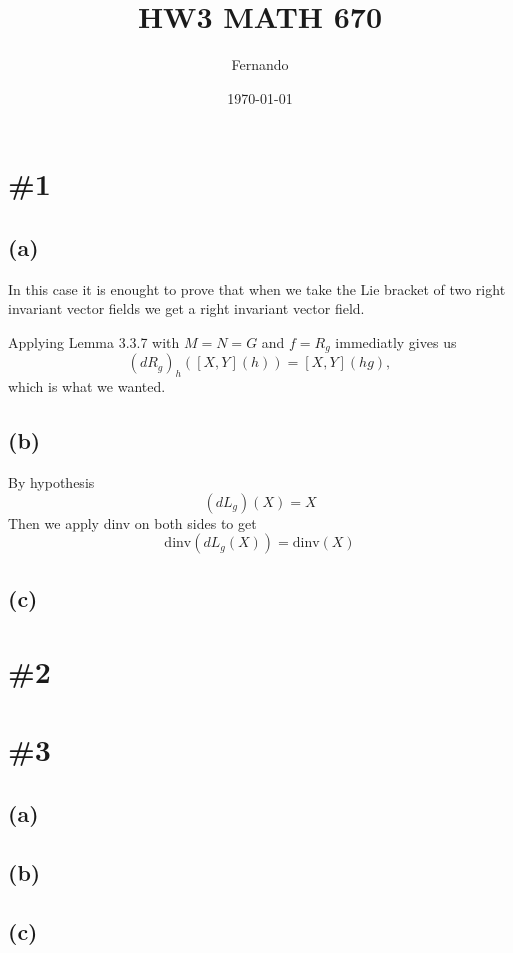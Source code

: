 \documentclass{article}
\begin{document}
\newcommand{\R}{\mathbb{R}}

\title{HW3 MATH 670}
\author{Fernando}
\date{\today}
\maketitle

\section*{\#1}
\subsection*{(a)}
In this case it is enought to prove that when we take the Lie bracket of two
right invariant vector fields we get a right invariant vector field.

Applying Lemma 3.3.7 with $M=N=G$ and $f=R_g$ immediatly gives us
\[
  (dR_g)_h([X,Y](h))=[X,Y](hg),
\]
which is what we wanted.
\subsection*{(b)}
By hypothesis
\[
  (dL_g)(X)=X
\]
Then we apply dinv on both sides to get
\[
  \text{dinv}(dL_g(X))=\text{dinv}(X)
\]
\subsection*{(c)}
\section*{\#2}
\section*{\#3}
\subsection*{(a)}
\subsection*{(b)}
\subsection*{(c)}
\end{document}
